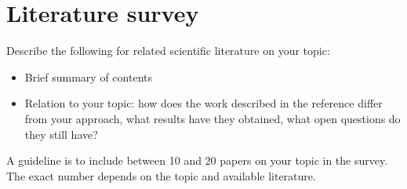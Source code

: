 \chapter{Literature survey}

Describe the following for related scientific literature on your topic:
\begin{itemize}
\item Brief summary of contents
\item Relation to your topic: how does the work described in the reference differ from your approach, what results have they obtained, what open questions do they still have?
\end{itemize}

A guideline is to include between 10 and 20 papers on your topic in the survey. The exact number depends on the topic and available literature.

\lipsum[19]
